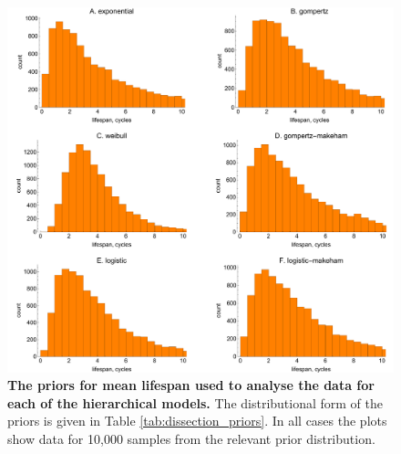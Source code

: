 \documentclass[12pt]{article}
\begin{document}
{\begin{figure}[ht]
	\centerline{\includegraphics[width=1\textwidth]{./Figure_files/dissection_lifespanPriorsParity.pdf}}
	\caption{\textbf{The priors for mean lifespan used to analyse the data for each of the hierarchical models.} The distributional form of the priors is given in Table \ref{tab:dissection_priors}. In all cases the plots show data for 10,000 samples from the relevant prior distribution.}\label{fig:dissection_lifespanPriorsParity}
\end{figure}

}
\end{document}
